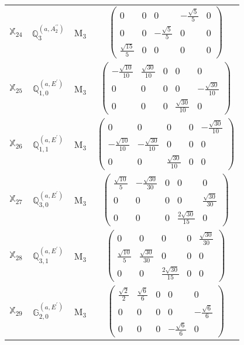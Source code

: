 \documentclass[fleqn,10pt,landscape]{article}
\begin{document}
\begin{itemize}
\begin{center}
\begin{longtable}{c|c|c|c}
$ \mathbb{X}_{24} $ & $\mathbb{Q}_{3}^{(a,A_{2}^{\prime\prime})}$ & M$_{3}$ & $\begin{pmatrix} 0 & 0 & 0 & - \frac{\sqrt{5}}{5} & 0 \\ 0 & 0 & - \frac{\sqrt{5}}{5} & 0 & 0 \\ \frac{\sqrt{15}}{5} & 0 & 0 & 0 & 0 \end{pmatrix}$ \\
$ \mathbb{X}_{25} $ & $\mathbb{Q}_{1,0}^{(a,E^{\prime})}$ & M$_{3}$ & $\begin{pmatrix} - \frac{\sqrt{10}}{10} & \frac{\sqrt{30}}{10} & 0 & 0 & 0 \\ 0 & 0 & 0 & 0 & - \frac{\sqrt{30}}{10} \\ 0 & 0 & 0 & \frac{\sqrt{30}}{10} & 0 \end{pmatrix}$ \\
$ \mathbb{X}_{26} $ & $\mathbb{Q}_{1,1}^{(a,E^{\prime})}$ & M$_{3}$ & $\begin{pmatrix} 0 & 0 & 0 & 0 & - \frac{\sqrt{30}}{10} \\ - \frac{\sqrt{10}}{10} & - \frac{\sqrt{30}}{10} & 0 & 0 & 0 \\ 0 & 0 & \frac{\sqrt{30}}{10} & 0 & 0 \end{pmatrix}$ \\
$ \mathbb{X}_{27} $ & $\mathbb{Q}_{3,0}^{(a,E^{\prime})}$ & M$_{3}$ & $\begin{pmatrix} \frac{\sqrt{10}}{5} & - \frac{\sqrt{30}}{30} & 0 & 0 & 0 \\ 0 & 0 & 0 & 0 & \frac{\sqrt{30}}{30} \\ 0 & 0 & 0 & \frac{2 \sqrt{30}}{15} & 0 \end{pmatrix}$ \\
$ \mathbb{X}_{28} $ & $\mathbb{Q}_{3,1}^{(a,E^{\prime})}$ & M$_{3}$ & $\begin{pmatrix} 0 & 0 & 0 & 0 & \frac{\sqrt{30}}{30} \\ \frac{\sqrt{10}}{5} & \frac{\sqrt{30}}{30} & 0 & 0 & 0 \\ 0 & 0 & \frac{2 \sqrt{30}}{15} & 0 & 0 \end{pmatrix}$ \\
$ \mathbb{X}_{29} $ & $\mathbb{G}_{2,0}^{(a,E^{\prime})}$ & M$_{3}$ & $\begin{pmatrix} \frac{\sqrt{2}}{2} & \frac{\sqrt{6}}{6} & 0 & 0 & 0 \\ 0 & 0 & 0 & 0 & - \frac{\sqrt{6}}{6} \\ 0 & 0 & 0 & - \frac{\sqrt{6}}{6} & 0 \end{pmatrix}$ \\

\end{longtable}
\end{center}
\end{itemize}
\end{document}
